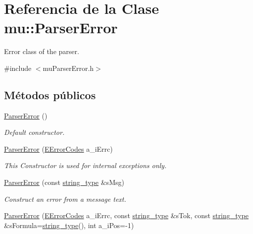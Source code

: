 \hypertarget{classmu_1_1_parser_error}{}\section{Referencia de la Clase mu\+:\+:Parser\+Error}
\label{classmu_1_1_parser_error}


Error class of the parser.  




{\ttfamily \#include $<$mu\+Parser\+Error.\+h$>$}

\subsection*{Métodos públicos}
\begin{DoxyCompactItemize}
\item 
\hyperlink{classmu_1_1_parser_error_ad7f1fb7501d606308cf41c3eeab49348}{Parser\+Error} ()
\begin{DoxyCompactList}\small\item\em Default constructor. \end{DoxyCompactList}\item 
\hyperlink{classmu_1_1_parser_error_a3f37c865f1c609337114f19525f4e625}{Parser\+Error} (\hyperlink{namespacemu_acf304a3ef5c4625d0eac5953aa1b688a}{E\+Error\+Codes} a\+\_\+i\+Errc)
\begin{DoxyCompactList}\small\item\em This Constructor is used for internal exceptions only. \end{DoxyCompactList}\item 
\hyperlink{classmu_1_1_parser_error_a67297c47b34173e5a331b3ff964d1bfc}{Parser\+Error} (const \hyperlink{namespacemu_ae9f8b44d9a97dd397180891e8390c3e9}{string\+\_\+type} \&s\+Msg)
\begin{DoxyCompactList}\small\item\em Construct an error from a message text. \end{DoxyCompactList}\item 
\hyperlink{classmu_1_1_parser_error_a3edd0b1277dcb33238b55d0aead6a764}{Parser\+Error} (\hyperlink{namespacemu_acf304a3ef5c4625d0eac5953aa1b688a}{E\+Error\+Codes} a\+\_\+i\+Errc, const \hyperlink{namespacemu_ae9f8b44d9a97dd397180891e8390c3e9}{string\+\_\+type} \&s\+Tok, const \hyperlink{namespacemu_ae9f8b44d9a97dd397180891e8390c3e9}{string\+\_\+type} \&s\+Formula=\hyperlink{namespacemu_ae9f8b44d9a97dd397180891e8390c3e9}{string\+\_\+type}(), int a\+\_\+i\+Pos=-\/1)

\end{DoxyCompactItemize}

